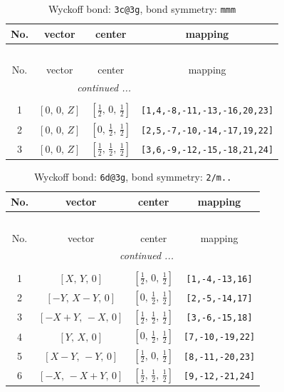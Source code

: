 \documentclass[fleqn,8pt]{jsarticle}
\begin{document}
\renewcommand{\arraystretch}{1.2}
\begin{longtable}{cccc}
\caption{Wyckoff bond: {\tt 3c@3g}, bond symmetry: {\tt mmm}}
 \\
 \hline \hline
No. & vector & center & mapping \\ \hline \endfirsthead

\multicolumn{3}{l}{\tablename\ \thetable{}} \\
 \hline \hline
No. & vector & center & mapping \\ \hline \endhead

 \hline \hline
\multicolumn{3}{r}{\footnotesize\it continued ...} \\ \endfoot

 \hline \hline
\multicolumn{3}{r}{} \\ \endlastfoot

1 & $\left[ 0,\, 0,\, Z \right]$ & $\left[ \frac{1}{2},\, 0,\, \frac{1}{2} \right]$ & {\tt [1,4,-8,-11,-13,-16,20,23]} \\ \hline
2 & $\left[ 0,\, 0,\, Z \right]$ & $\left[ 0,\, \frac{1}{2},\, \frac{1}{2} \right]$ & {\tt [2,5,-7,-10,-14,-17,19,22]} \\ \hline
3 & $\left[ 0,\, 0,\, Z \right]$ & $\left[ \frac{1}{2},\, \frac{1}{2},\, \frac{1}{2} \right]$ & {\tt [3,6,-9,-12,-15,-18,21,24]} \\
\end{longtable}
\renewcommand{\arraystretch}{1.2}
\begin{longtable}{cccc}
\caption{Wyckoff bond: {\tt 6d@3g}, bond symmetry: {\tt 2/m..}}
 \\
 \hline \hline
No. & vector & center & mapping \\ \hline \endfirsthead

\multicolumn{3}{l}{\tablename\ \thetable{}} \\
 \hline \hline
No. & vector & center & mapping \\ \hline \endhead

 \hline \hline
\multicolumn{3}{r}{\footnotesize\it continued ...} \\ \endfoot

 \hline \hline
\multicolumn{3}{r}{} \\ \endlastfoot

1 & $\left[ X,\, Y,\, 0 \right]$ & $\left[ \frac{1}{2},\, 0,\, \frac{1}{2} \right]$ & {\tt [1,-4,-13,16]} \\ \hline
2 & $\left[ - Y,\, X - Y,\, 0 \right]$ & $\left[ 0,\, \frac{1}{2},\, \frac{1}{2} \right]$ & {\tt [2,-5,-14,17]} \\ \hline
3 & $\left[ - X + Y,\, - X,\, 0 \right]$ & $\left[ \frac{1}{2},\, \frac{1}{2},\, \frac{1}{2} \right]$ & {\tt [3,-6,-15,18]} \\ \hline
4 & $\left[ Y,\, X,\, 0 \right]$ & $\left[ 0,\, \frac{1}{2},\, \frac{1}{2} \right]$ & {\tt [7,-10,-19,22]} \\ \hline
5 & $\left[ X - Y,\, - Y,\, 0 \right]$ & $\left[ \frac{1}{2},\, 0,\, \frac{1}{2} \right]$ & {\tt [8,-11,-20,23]} \\ \hline
6 & $\left[ - X,\, - X + Y,\, 0 \right]$ & $\left[ \frac{1}{2},\, \frac{1}{2},\, \frac{1}{2} \right]$ & {\tt [9,-12,-21,24]} \\
\end{longtable}
\end{document}
